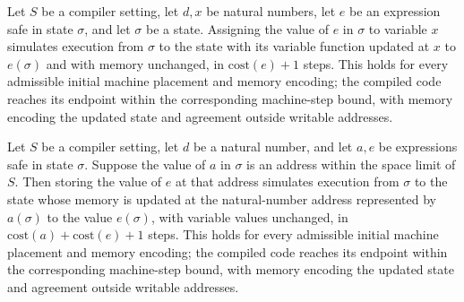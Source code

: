 \begin{theorem}
\label{Light.Compiler.sim_set}
\leanok
{}
Let $S$ be a compiler setting, let $d,x$ be natural numbers, let $e$ be an expression
safe in state $\sigma$, and let $\sigma$ be a state. Assigning the value of $e$ in
$\sigma$ to variable $x$ simulates execution from $\sigma$ to the state with its
variable function updated at $x$ to $e(\sigma)$ and with memory unchanged, in
$\mathrm{cost}(e)+1$ steps. This holds for every admissible initial machine placement
and memory encoding; the compiled code reaches its endpoint within the corresponding
machine-step bound, with memory encoding the updated state and agreement outside
writable addresses.
\end{theorem}

\begin{theorem}
\label{Light.Compiler.sim_store}
\leanok
{}
Let $S$ be a compiler setting, let $d$ be a natural number, and let $a,e$ be expressions
safe in state $\sigma$. Suppose the value of $a$ in $\sigma$ is an address within the
space limit of $S$. Then storing the value of $e$ at that address simulates execution
from $\sigma$ to the state whose memory is updated at the natural-number address
represented by $a(\sigma)$ to the value $e(\sigma)$, with variable values unchanged, in
$\mathrm{cost}(a)+\mathrm{cost}(e)+1$ steps. This holds for every admissible initial
machine placement and memory encoding; the compiled code reaches its endpoint within the
corresponding machine-step bound, with memory encoding the updated state and agreement
outside writable addresses.
\end{theorem}

